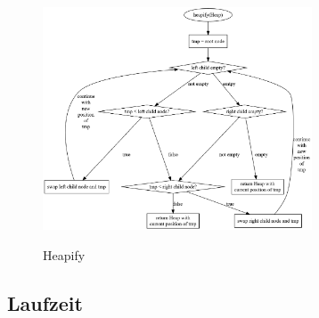 \documentclass[11pt]{article}
\begin{document}
    \begin{figure}[hbt]
        \caption{Heapify}
        \centering
        \includegraphics[width = 8cm]{heapify.pdf}\label{fig:heapify}
    \end{figure}

    \subsection{Laufzeit}\label{subsec:Hlaufzeit}
\end{document}
